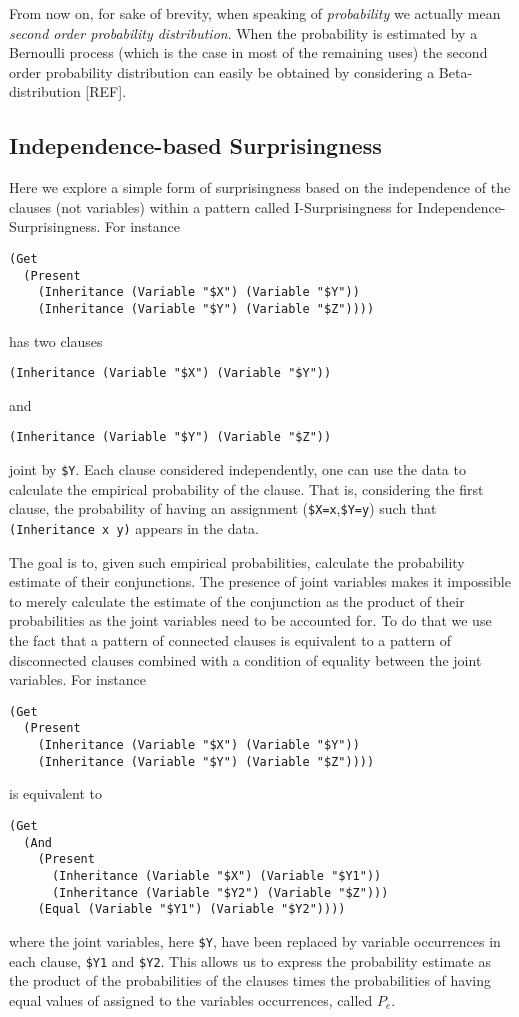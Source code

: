 \documentclass[runningheads]{llncs}
\begin{document}
From now on, for sake of brevity, when speaking of \emph{probability}
we actually mean \emph{second order probability distribution}. When
the probability is estimated by a Bernoulli process (which is the case
in most of the remaining uses) the second order probability
distribution can easily be obtained by considering a Beta-distribution
[REF].

\subsection{Independence-based Surprisingness}

Here we explore a simple form of surprisingness based on the
independence of the clauses (not variables) within a pattern called
I-Surprisingness for Independence-Surprisingness. For instance
\begin{verbatim}
(Get
  (Present
    (Inheritance (Variable "$X") (Variable "$Y"))
    (Inheritance (Variable "$Y") (Variable "$Z"))))
\end{verbatim}
has two clauses
\begin{verbatim}
(Inheritance (Variable "$X") (Variable "$Y"))
\end{verbatim}
and
\begin{verbatim}
(Inheritance (Variable "$Y") (Variable "$Z"))
\end{verbatim}
joint by \texttt{\$Y}. Each clause considered independently, one can
use the data to calculate the empirical probability of the
clause. That is, considering the first clause, the probability of
having an assignment (\texttt{\$X=x},\texttt{\$Y=y}) such that
\texttt{(Inheritance x y)} appears in the data.

The goal is to, given such empirical probabilities, calculate the
probability estimate of their conjunctions. The presence of joint
variables makes it impossible to merely calculate the estimate of the
conjunction as the product of their probabilities as the joint
variables need to be accounted for. To do that we use the fact that a
pattern of connected clauses is equivalent to a pattern of
disconnected clauses combined with a condition of equality between the
joint variables. For instance
\begin{verbatim}
(Get
  (Present
    (Inheritance (Variable "$X") (Variable "$Y"))
    (Inheritance (Variable "$Y") (Variable "$Z"))))
\end{verbatim}
is equivalent to
\begin{verbatim}
(Get
  (And
    (Present
      (Inheritance (Variable "$X") (Variable "$Y1"))
      (Inheritance (Variable "$Y2") (Variable "$Z")))
    (Equal (Variable "$Y1") (Variable "$Y2"))))
\end{verbatim}
where the joint variables, here \texttt{\$Y}, have been replaced by
variable occurrences in each clause, \texttt{\$Y1} and
\texttt{\$Y2}. This allows us to express the probability estimate as
the product of the probabilities of the clauses times the
probabilities of having equal values of assigned to the variables
occurrences, called $P_e$.
\end{document}
